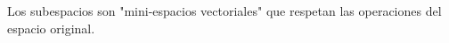 \documentclass[preview]{standalone}
\begin{document}
\begin{center}
Los subespacios son "mini-espacios vectoriales" que respetan las operaciones del espacio original.
\end{center}
\end{document}
